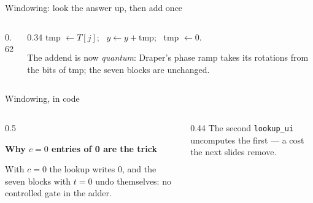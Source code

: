 \documentclass[aspectratio=169,11pt]{beamer}
\newcommand{\blocktitle}[1]{{\bfseries #1}\par\vskip1mm}
\newcommand{\code}[2][]{}
\newcommand{\bundle}[3]{\draw[thick,color=body] (#1-0.07,#2-0.13) -- (#1+0.07,#2+0.13);
  \node[font=\tiny,color=subtle,above right=-1pt] at (#1,#2) {#3};}
\begin{document}
\begin{frame}[fragile]{Windowing: look the answer up, then add once}
  \begin{columns}[c]
    \begin{column}{0.62\textwidth}
      \centering
    \end{column}
    \begin{column}{0.34\textwidth}
      \small tmp $\leftarrow T[j]$; \ $y\leftarrow y+\text{tmp}$; \ tmp $\leftarrow0$.\par\vskip1mm
      The addend is now \emph{quantum}: Draper's phase ramp takes its rotations from the bits of tmp; the seven blocks are unchanged.
    \end{column}
  \end{columns}
  \code[basicstyle=\ttfamily\scriptsize]{add_quantum_mod.py}
\end{frame}

\begin{frame}[fragile]{Windowing, in code}
  \code[basicstyle=\ttfamily\scriptsize]{windowed.py}
  \begin{columns}[T]
    \begin{column}{0.5\textwidth}
      \begin{greyblock}[fontupper=\small]
        \blocktitle{Why $c=0$ entries of 0 are the trick}
        With $c=0$ the lookup writes 0, and the seven blocks with $t=0$ undo themselves: no controlled gate in the adder.
      \end{greyblock}
    \end{column}
    \begin{column}{0.44\textwidth}
      \small The second \texttt{lookup\_ui} uncomputes the first --- a cost the next slides remove.
    \end{column}
  \end{columns}
\end{frame}
\end{document}
